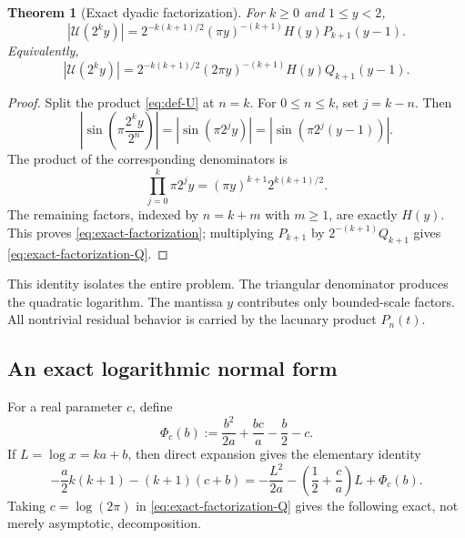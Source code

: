 \documentclass[11pt,oneside]{article}
\newtheorem{theorem}{Theorem}[section]
\theoremstyle{definition}
\theoremstyle{remark}
\newcommand{\Uhat}{\mathcal U}
\begin{document}
\begin{theorem}[Exact dyadic factorization]\label{thm:factorization}
For $k\ge0$ and $1\le y<2$,
\begin{equation}\label{eq:exact-factorization}
 |\Uhat(2^ky)|
 =2^{-k(k+1)/2}(\pi y)^{-(k+1)}H(y)P_{k+1}(y-1).
\end{equation}
Equivalently,
\begin{equation}\label{eq:exact-factorization-Q}
 |\Uhat(2^ky)|
 =2^{-k(k+1)/2}(2\pi y)^{-(k+1)}H(y)Q_{k+1}(y-1).
\end{equation}
\end{theorem}

\begin{proof}
Split the product \eqref{eq:def-U} at $n=k$.  For $0\le n\le k$, set $j=k-n$.
Then
\[
 \left|\sin\!\left(\pi\frac{2^ky}{2^n}\right)\right|
 =|\sin(\pi2^jy)|
 =|\sin(\pi2^j(y-1))|.
\]
The product of the corresponding denominators is
\[
 \prod_{j=0}^{k}\pi2^jy
 =(\pi y)^{k+1}2^{k(k+1)/2}.
\]
The remaining factors, indexed by $n=k+m$ with $m\ge1$, are exactly $H(y)$.
This proves \eqref{eq:exact-factorization}; multiplying $P_{k+1}$ by
$2^{-(k+1)}Q_{k+1}$ gives \eqref{eq:exact-factorization-Q}.
\end{proof}

This identity isolates the entire problem.  The triangular denominator produces the
quadratic logarithm.  The mantissa $y$ contributes only bounded-scale factors.  All
nontrivial residual behavior is carried by the lacunary product $P_n(t)$.

\subsection{An exact logarithmic normal form}

For a real parameter $c$, define
\begin{equation}\label{eq:Phi}
 \Phi_c(b):=\frac{b^2}{2a}+\frac{bc}{a}-\frac b2-c.
\end{equation}
If $L=\log x=ka+b$, then direct expansion gives the elementary identity
\begin{equation}\label{eq:algebra-identity}
 -\frac a2k(k+1)-(k+1)(c+b)
 =-\frac{L^2}{2a}
  -\left(\frac12+\frac ca\right)L+\Phi_c(b).
\end{equation}
Taking $c=\log(2\pi)$ in \eqref{eq:exact-factorization-Q} gives the following exact,
not merely asymptotic, decomposition.
\end{document}
